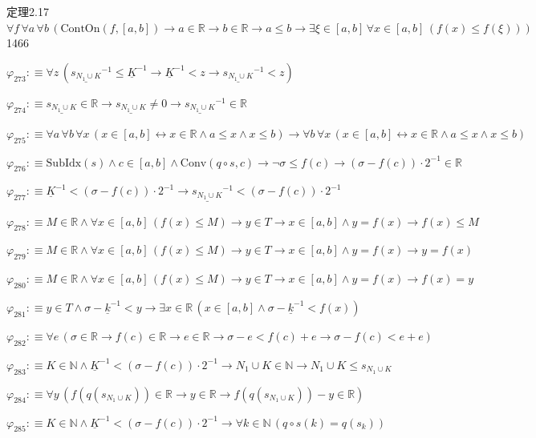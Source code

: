 \begin{fullproof}{定理2.17}{$\forall f\,\forall a\,\forall b\,(\mathrm{ContOn}(f,[a,b]) \to a \in \mathbb{R} \to b \in \mathbb{R} \to a \leq b \to \exists \xi \in [a,b]\,\forall x \in [a,b]\,(f(x) \leq f(\xi)))$}{1466}
\begin{abbrevlist}
\item $\varphi_{273} :\equiv \forall z\,(\underline{s_{N_{1} \cup K}}^{-1} \leq \underline{K}^{-1} \to \underline{K}^{-1} < z \to \underline{s_{N_{1} \cup K}}^{-1} < z)$
\item $\varphi_{274} :\equiv \underline{s_{N_{1} \cup K}} \in \mathbb{R} \to \underline{s_{N_{1} \cup K}} \neq 0 \to \underline{s_{N_{1} \cup K}}^{-1} \in \mathbb{R}$
\item $\varphi_{275} :\equiv \forall a\,\forall b\,\forall x\,(x \in [a,b] \leftrightarrow x \in \mathbb{R} \land a \leq x \land x \leq b) \to \forall b\,\forall x\,(x \in [a,b] \leftrightarrow x \in \mathbb{R} \land a \leq x \land x \leq b)$
\item $\varphi_{276} :\equiv \mathrm{SubIdx}(s) \land c \in [a,b] \land \mathrm{Conv}(q \circ s,c) \to \neg \sigma \leq f(c) \to (\sigma - f(c)) \cdot 2^{-1} \in \mathbb{R}$
\item $\varphi_{277} :\equiv \underline{K}^{-1} < (\sigma - f(c)) \cdot 2^{-1} \to \underline{s_{N_{1} \cup K}}^{-1} < (\sigma - f(c)) \cdot 2^{-1}$
\item $\varphi_{278} :\equiv M \in \mathbb{R} \land \forall x \in [a,b]\,(f(x) \leq M) \to y \in T \to x \in [a,b] \land y = f(x) \to f(x) \leq M$
\item $\varphi_{279} :\equiv M \in \mathbb{R} \land \forall x \in [a,b]\,(f(x) \leq M) \to y \in T \to x \in [a,b] \land y = f(x) \to y = f(x)$
\item $\varphi_{280} :\equiv M \in \mathbb{R} \land \forall x \in [a,b]\,(f(x) \leq M) \to y \in T \to x \in [a,b] \land y = f(x) \to f(x) = y$
\item $\varphi_{281} :\equiv y \in T \land \sigma - \underline{k}^{-1} < y \to \exists x \in \mathbb{R}\,(x \in [a,b] \land \sigma - \underline{k}^{-1} < f(x))$
\item $\varphi_{282} :\equiv \forall e\,(\sigma \in \mathbb{R} \to f(c) \in \mathbb{R} \to e \in \mathbb{R} \to \sigma - e < f(c) + e \to \sigma - f(c) < e + e)$
\item $\varphi_{283} :\equiv K \in \mathbb{N} \land \underline{K}^{-1} < (\sigma - f(c)) \cdot 2^{-1} \to N_{1} \cup K \in \mathbb{N} \to N_{1} \cup K \leq s_{N_{1} \cup K}$
\item $\varphi_{284} :\equiv \forall y\,(f(q(s_{N_{1} \cup K})) \in \mathbb{R} \to y \in \mathbb{R} \to f(q(s_{N_{1} \cup K})) - y \in \mathbb{R})$
\item $\varphi_{285} :\equiv K \in \mathbb{N} \land \underline{K}^{-1} < (\sigma - f(c)) \cdot 2^{-1} \to \forall k \in \mathbb{N}\,(q \circ s(k) = q(s_{k}))$

\end{abbrevlist}
\end{fullproof}
